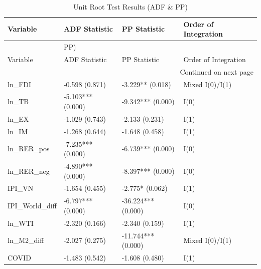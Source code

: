 \begin{longtable}{llll}
\caption{Unit Root Test Results (ADF & PP)} \label{tab:unit_root} \\
\toprule
Variable & ADF Statistic & PP Statistic & Order of Integration \\
\midrule
\endfirsthead
\caption[]{Unit Root Test Results (ADF & PP)} \\
\toprule
Variable & ADF Statistic & PP Statistic & Order of Integration \\
\midrule
\endhead
\midrule
\multicolumn{4}{r}{Continued on next page} \\
\midrule
\endfoot
\bottomrule
\endlastfoot
ln\_FDI & -0.598 (0.871) & -3.229** (0.018) & Mixed I(0)/I(1) \\
ln\_TB & -5.103*** (0.000) & -9.342*** (0.000) & I(0) \\
ln\_EX & -1.029 (0.743) & -2.133 (0.231) & I(1) \\
ln\_IM & -1.268 (0.644) & -1.648 (0.458) & I(1) \\
ln\_RER\_pos & -7.235*** (0.000) & -6.739*** (0.000) & I(0) \\
ln\_RER\_neg & -4.890*** (0.000) & -8.397*** (0.000) & I(0) \\
IPI\_VN & -1.654 (0.455) & -2.775* (0.062) & I(1) \\
IPI\_World\_diff & -6.797*** (0.000) & -36.224*** (0.000) & I(0) \\
ln\_WTI & -2.320 (0.166) & -2.340 (0.159) & I(1) \\
ln\_M2\_diff & -2.027 (0.275) & -11.744*** (0.000) & Mixed I(0)/I(1) \\
COVID & -1.483 (0.542) & -1.608 (0.480) & I(1) \\
\end{longtable}
